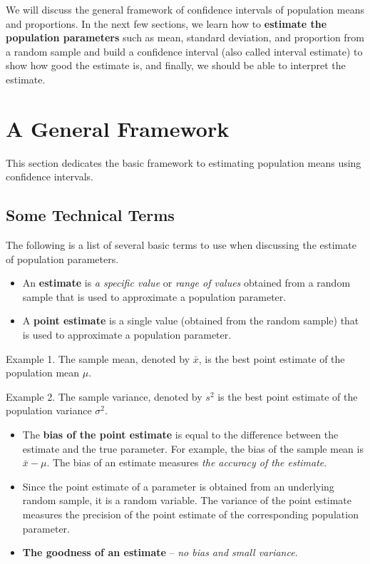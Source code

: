 \documentclass[
]{book}
\begin{document}
We will discuss the general framework of confidence intervals of population means and proportions. In the next few sections, we learn how to \textbf{estimate the population parameters} such as mean, standard deviation, and proportion from a random sample and build a confidence interval (also called interval estimate) to show how good the estimate is, and finally, we should be able to interpret the estimate.

\hypertarget{a-general-framework}{%
\section{A General Framework}\label{a-general-framework}}

This section dedicates the basic framework to estimating population means using confidence intervals.

\hypertarget{some-technical-terms}{%
\subsection{Some Technical Terms}\label{some-technical-terms}}

The following is a list of several basic terms to use when discussing the estimate of population parameters.

\begin{itemize}
\item
  An \textbf{estimate} is \emph{a specific value} or \emph{range of values} obtained from a random sample that is used to approximate a population parameter.
\item
  A \textbf{point estimate} is a single value (obtained from the random sample) that is used to approximate a population parameter.
\end{itemize}

Example 1. The sample mean, denoted by \(\bar{x}\), is the best point estimate of the population mean \(\mu\).

Example 2. The sample variance, denoted by \(s^2\) is the best point estimate of the population variance \(\sigma^2\).

\begin{itemize}
\item
  The \textbf{bias of the point estimate} is equal to the difference between the estimate and the true parameter. For example, the bias of the sample mean is \(\bar{x} -\mu\). The bias of an estimate measures \emph{the accuracy of the estimate}.
\item
  Since the point estimate of a parameter is obtained from an underlying random sample, it is a random variable. The variance of the point estimate measures the precision of the point estimate of the corresponding population parameter.
\item
  \textbf{The goodness of an estimate} -- \emph{no bias and small variance}.
\end{itemize}
\end{document}
